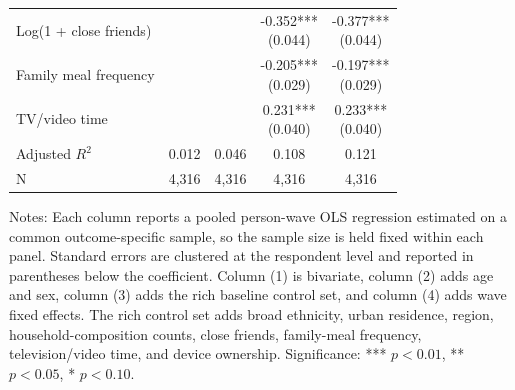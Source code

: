 \begin{table}[!htbp]
\begin{tabular}{lcccc}
\\
Log(1 + close friends) &  &  & \shortstack[c]{-0.352*** \\[-0.35ex] (0.044)} & \shortstack[c]{-0.377*** \\[-0.35ex] (0.044)}
\\
Family meal frequency &  &  & \shortstack[c]{-0.205*** \\[-0.35ex] (0.029)} & \shortstack[c]{-0.197*** \\[-0.35ex] (0.029)}
\\
TV/video time &  &  & \shortstack[c]{0.231*** \\[-0.35ex] (0.040)} & \shortstack[c]{0.233*** \\[-0.35ex] (0.040)}
\\
\hline
Adjusted $R^2$ & 0.012 & 0.046 & 0.108 & 0.121
\\
N & 4,316 & 4,316 & 4,316 & 4,316
\\
\hline
\end{tabular}
\renewcommand{\arraystretch}{1}
\begin{minipage}{0.95\textwidth}
\footnotesize Notes: Each column reports a pooled person-wave OLS regression estimated on a common outcome-specific sample, so the sample size is held fixed within each panel. Standard errors are clustered at the respondent level and reported in parentheses below the coefficient. Column (1) is bivariate, column (2) adds age and sex, column (3) adds the rich baseline control set, and column (4) adds wave fixed effects. The rich control set adds broad ethnicity, urban residence, region, household-composition counts, close friends, family-meal frequency, television/video time, and device ownership. Significance: *** \(p < 0.01\), ** \(p < 0.05\), * \(p < 0.10\).
\end{minipage}
\end{table}
